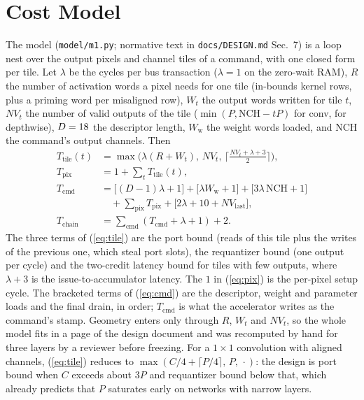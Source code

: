 \documentclass[conference]{IEEEtran}
\begin{document}
\section{Cost Model}\label{sec:model}
The model (\texttt{model/m1.py}; normative text in \texttt{docs/DESIGN.md} Sec.~7) is a loop nest over the output pixels and channel tiles of a command, with one closed form per tile. Let $\lambda$ be the cycles per bus transaction ($\lambda=1$ on the zero-wait RAM), $R$ the number of activation words a pixel needs for one tile (in-bounds kernel rows, plus a priming word per misaligned row), $W_t$ the output words written for tile $t$, $NV_t$ the number of valid outputs of the tile ($\min(P, \mathrm{NCH}-tP)$ for conv, \Lanes{} for depthwise), $D=18$ the descriptor length, $W_{\mathrm{w}}$ the weight words loaded, and NCH the command's output channels. Then
\begin{align}
T_{\mathrm{tile}}(t) &= \max\bigl(\lambda(R{+}W_t),\, NV_t,\, \bigl\lceil\tfrac{NV_t+\lambda+3}{2}\bigr\rceil\bigr),\label{eq:tile}\\
T_{\mathrm{pix}} &= 1+\textstyle\sum_t T_{\mathrm{tile}}(t),\label{eq:pix}\\
T_{\mathrm{cmd}} &= \bigl[(D{-}1)\lambda+1\bigr] + \bigl[\lambda W_{\mathrm{w}}+1\bigr] + \bigl[3\lambda\,\mathrm{NCH}+1\bigr]\nonumber\\
&\quad + \textstyle\sum_{\mathrm{pix}} T_{\mathrm{pix}} + \bigl[2\lambda+10+NV_{\mathrm{last}}\bigr],\label{eq:cmd}\\
T_{\mathrm{chain}} &= \textstyle\sum_{\mathrm{cmd}} (T_{\mathrm{cmd}}+\lambda+1) + 2.\label{eq:chain}
\end{align}
The three terms of (\ref{eq:tile}) are the port bound (reads of this tile plus the writes of the previous one, which steal port slots), the requantizer bound (one output per cycle) and the two-credit latency bound for tiles with few outputs, where $\lambda+3$ is the issue-to-accumulator latency. The $1$ in (\ref{eq:pix}) is the per-pixel setup cycle. The bracketed terms of (\ref{eq:cmd}) are the descriptor, weight and parameter loads and the final drain, in order; $T_{\mathrm{cmd}}$ is what the accelerator writes as the command's stamp. Geometry enters only through $R$, $W_t$ and $NV_t$, so the whole model fits in a page of the design document and was recomputed by hand for three layers by a reviewer before freezing. For a $1\times1$ convolution with aligned channels, (\ref{eq:tile}) reduces to $\max(C/4+\lceil P/4\rceil,\,P,\,\cdot)$: the design is port bound when $C$ exceeds about $3P$ and requantizer bound below that, which already predicts that $P$ saturates early on networks with narrow layers.
\end{document}
